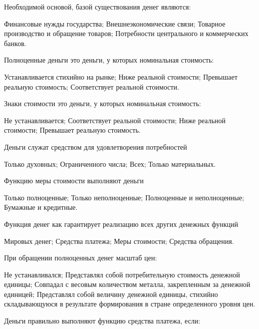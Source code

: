 \documentclass[12pt, table]{exam}
\begin{document}
\begin{questions}
\begin{multicols}{2}
\setlength{\columnsep}{1cm}

\question Необходимой основой, базой существования денег являются:
	 \begin{choices}
	 \choice Финансовые нужды государства;
	 \choice Внешнеэкономические связи;
	 \CC Товарное производство и обращение товаров;
	 \choice Потребности центрального и коммерческих банков.
	 \end{choices}
\question Полноценные деньги  это деньги, у которых номинальная стоимость:
	 \begin{choices}
	 \choice Устанавливается стихийно на рынке;
	 \choice Ниже реальной стоимости;
	 \choice Превышает реальную стоимость;
	 \CC Соответствует реальной стоимости.
	 \end{choices}
\question Знаки стоимости  это деньги, у которых номинальная стоимость:
	 \begin{choices}
	 \choice Не устанавливается;
	 \choice Соответствует реальной стоимости;
	 \choice Ниже реальной стоимости;
	 \CC Превышает реальную стоимость.
	 \end{choices}
\question Деньги служат средством для удовлетворения  потребностей
	 \begin{choices}
	 \choice Только духовных;
	 \choice Ограниченного числа;
	 \CC Всех;
	 \choice Только материальных.
	 \end{choices}
\question Функцию меры стоимости выполняют  деньги
	 \begin{choices}
	 \CC Только полноценные;
	 \choice Только неполноценные;
	 \choice Полноценные и неполноценные;
	 \choice Бумажные и кредитные.
	 \end{choices}
\question Функция денег как  гарантирует реализацию всех других денежных функций
	 \begin{choices}
	 \choice Мировых денег;
	 \choice Средства платежа;
	 \CC Меры стоимости;
	 \choice Средства обращения.
	 \end{choices}
\question При обращении полноценных денег масштаб цен:
	 \begin{choices}
	 \choice Не устанавливался;
	 \choice Представлял собой потребительную стоимость денежной единицы;
	 \CC Совпадал с весовым количеством металла, закрепленным за денежной единицей;
	 \choice Представлял собой величину денежной единицы, стихийно складывающуюся в результате формирования в стране определенного уровня цен.
	 \end{choices}
\question Деньги правильно выполняют функцию средства платежа, если:

\end{multicols}
\end{questions}
\end{document}

